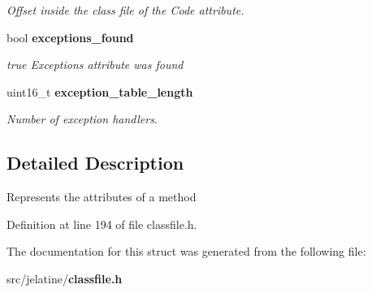 \begin{DoxyCompactItemize}
\begin{DoxyCompactList}\small\item\em Offset inside the class file of the Code attribute. \item\end{DoxyCompactList}\item 
bool {\bf exceptions\_\-found}\label{structmethod__attributes__t_a6190fae167350d4f0b2e8422b013ad00}

\begin{DoxyCompactList}\small\item\em true Exceptions attribute was found \item\end{DoxyCompactList}\item 
uint16\_\-t {\bf exception\_\-table\_\-length}\label{structmethod__attributes__t_a6f974280d5ac950713cc30530388e790}

\begin{DoxyCompactList}\small\item\em Number of exception handlers. \item\end{DoxyCompactList}\end{DoxyCompactItemize}


\subsection{Detailed Description}
Represents the attributes of a method 

Definition at line 194 of file classfile.h.



The documentation for this struct was generated from the following file:\begin{DoxyCompactItemize}
\item 
src/jelatine/{\bf classfile.h}\end{DoxyCompactItemize}
